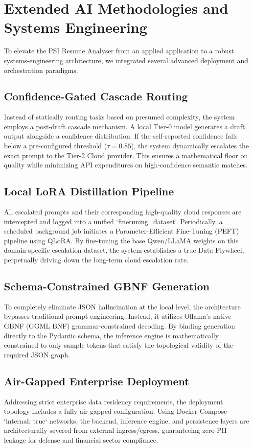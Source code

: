 \documentclass[10pt,journal,compsoc]{IEEEtran}
\begin{document}
\section{Extended AI Methodologies and Systems Engineering}\label{sec:extended_ai}
To elevate the PSI Resume Analyser from an applied application to a robust systems-engineering architecture, we integrated several advanced deployment and orchestration paradigms.

\subsection{Confidence-Gated Cascade Routing}
Instead of statically routing tasks based on presumed complexity, the system employs a post-draft cascade mechanism. A local Tier-0 model generates a draft output alongside a confidence distribution. If the self-reported confidence falls below a pre-configured threshold ($\tau = 0.85$), the system dynamically escalates the exact prompt to the Tier-2 Cloud provider. This ensures a mathematical floor on quality while minimizing API expenditures on high-confidence semantic matches.

\subsection{Local LoRA Distillation Pipeline}
All escalated prompts and their corresponding high-quality cloud responses are intercepted and logged into a unified `finetuning\_dataset`. Periodically, a scheduled background job initiates a Parameter-Efficient Fine-Tuning (PEFT) pipeline using QLoRA. By fine-tuning the base Qwen/LLaMA weights on this domain-specific escalation dataset, the system establishes a true Data Flywheel, perpetually driving down the long-term cloud escalation rate.

\subsection{Schema-Constrained GBNF Generation}
To completely eliminate JSON hallucination at the local level, the architecture bypasses traditional prompt engineering. Instead, it utilizes Ollama's native GBNF (GGML BNF) grammar-constrained decoding. By binding generation directly to the Pydantic schema, the inference engine is mathematically constrained to only sample tokens that satisfy the topological validity of the required JSON graph.

\subsection{Air-Gapped Enterprise Deployment}
Addressing strict enterprise data residency requirements, the deployment topology includes a fully air-gapped configuration. Using Docker Compose `internal: true` networks, the backend, inference engine, and persistence layers are architecturally severed from external ingress/egress, guaranteeing zero PII leakage for defense and financial sector compliance.
\end{document}
